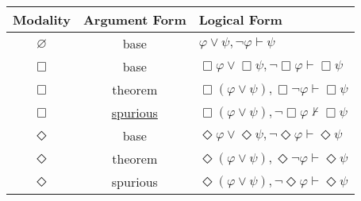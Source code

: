 \small\centering
\begin{tabular}{ccl}
    \toprule
Modality & Argument Form & Logical Form \\
    \midrule
$\varnothing$ & base & $\varphi \lor \psi, \lnot \varphi \vdash \psi$ \\
$\Box$ & base & $\Box \varphi \lor \Box \psi, \lnot \Box \varphi \vdash \Box \psi$ \\
$\Box$ & theorem & $\Box ( \varphi \lor \psi), \Box \lnot \varphi \vdash \Box \psi$ \\
$\Box$ & \uline{spurious} & $\Box ( \varphi \lor \psi), \lnot \Box \varphi \nvdash \Box \psi$ \\
$\Diamond$ & base & $\Diamond \varphi \lor \Diamond \psi, \lnot \Diamond \varphi \vdash \Diamond \psi$ \\
$\Diamond$ & theorem & $\Diamond ( \varphi \lor \psi), \Diamond \lnot \varphi \vdash \Diamond \psi$ \\
$\Diamond$ & spurious & $\Diamond ( \varphi \lor \psi), \lnot \Diamond \varphi \vdash \Diamond \psi$ \\
    \bottomrule
    \end{tabular}